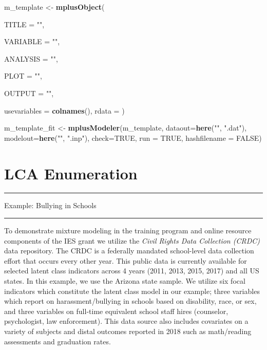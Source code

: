 \documentclass[
]{book}
\newenvironment{Shaded}{\begin{snugshade}}{\end{snugshade}}
\newcommand{\AttributeTok}[1]{\textcolor[rgb]{0.13,0.29,0.53}{#1}}
\newcommand{\ConstantTok}[1]{\textcolor[rgb]{0.56,0.35,0.01}{#1}}
\newcommand{\FunctionTok}[1]{\textcolor[rgb]{0.13,0.29,0.53}{\textbf{#1}}}
\newcommand{\NormalTok}[1]{#1}
\newcommand{\OtherTok}[1]{\textcolor[rgb]{0.56,0.35,0.01}{#1}}
\newcommand{\StringTok}[1]{\textcolor[rgb]{0.31,0.60,0.02}{#1}}
\begin{document}
\begin{Shaded}
\begin{Highlighting}[]
\NormalTok{m\_template  }\OtherTok{\textless{}{-}} \FunctionTok{mplusObject}\NormalTok{(}
  
  \AttributeTok{TITLE =} 
    \StringTok{""}\NormalTok{, }
  
  \AttributeTok{VARIABLE =} 
    \StringTok{""}\NormalTok{,}
  
  \AttributeTok{ANALYSIS =} 
    \StringTok{""}\NormalTok{,}
  
  \AttributeTok{PLOT =} 
    \StringTok{""}\NormalTok{,}
  
  \AttributeTok{OUTPUT =} 
    \StringTok{""}\NormalTok{,}
 
  \AttributeTok{usevariables =} \FunctionTok{colnames}\NormalTok{(), }
  \AttributeTok{rdata =}\NormalTok{  )}

\NormalTok{m\_template\_fit }\OtherTok{\textless{}{-}} \FunctionTok{mplusModeler}\NormalTok{(m\_template, }
                  \AttributeTok{dataout=}\FunctionTok{here}\NormalTok{(}\StringTok{""}\NormalTok{, }\StringTok{".dat"}\NormalTok{),}
                  \AttributeTok{modelout=}\FunctionTok{here}\NormalTok{(}\StringTok{""}\NormalTok{, }\StringTok{".inp"}\NormalTok{),}
                  \AttributeTok{check=}\ConstantTok{TRUE}\NormalTok{, }\AttributeTok{run =} \ConstantTok{TRUE}\NormalTok{, }\AttributeTok{hashfilename =} \ConstantTok{FALSE}\NormalTok{)}
\end{Highlighting}
\end{Shaded}

\chapter{LCA Enumeration}\label{lca-enumeration}

\begin{center}\rule{0.5\linewidth}{0.5pt}\end{center}

Example: Bullying in Schools

\begin{center}\rule{0.5\linewidth}{0.5pt}\end{center}

To demonstrate mixture modeling in the training program and online resource components of the IES grant we utilize the \emph{Civil Rights Data Collection (CRDC)}\citep{usdoe2014} data repository.
The CRDC is a federally mandated school-level data collection effort that occurs every other year.
This public data is currently available for selected latent class indicators across 4 years (2011, 2013, 2015, 2017) and all US states.
In this example, we use the Arizona state sample.
We utilize six focal indicators which constitute the latent class model in our example; three variables which report on harassment/bullying in schools based on disability, race, or sex, and three variables on full-time equivalent school staff hires (counselor, psychologist, law enforcement).
This data source also includes covariates on a variety of subjects and distal outcomes reported in 2018 such as math/reading assessments and graduation rates.
\end{document}
